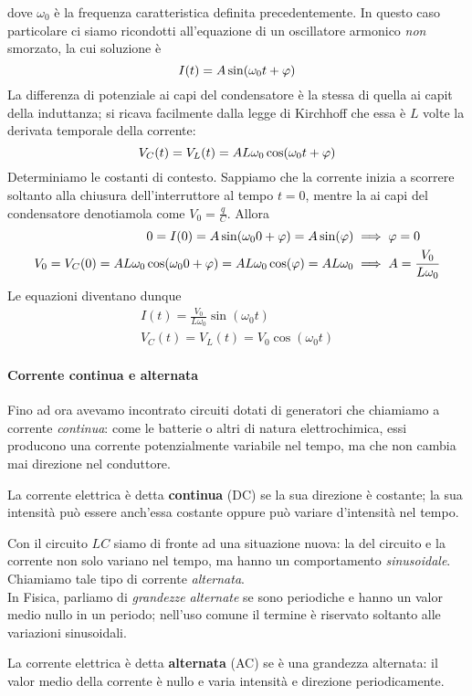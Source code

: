 dove $\omega_0$ è la frequenza caratteristica definita precedentemente. In questo caso particolare ci siamo ricondotti all'equazione di un oscillatore armonico \textit{non} smorzato, la cui soluzione è
\begin{equation}
	I(t)=A\sin(\omega_0 t+\oldphi)
\end{equation}
La differenza di potenziale ai capi del condensatore è la stessa di quella ai capit della induttanza; si ricava facilmente dalla legge di Kirchhoff che essa è $L$ volte la derivata temporale della corrente:
\begin{equation*}
	V_C(t)=V_L(t)=AL\omega_0\cos(\omega_0 t+\oldphi)
\end{equation*}
Determiniamo le costanti di contesto. Sappiamo che la corrente inizia a scorrere soltanto alla chiusura dell'interruttore al tempo $t=0$, mentre la \ddp ai capi del condensatore denotiamola come $V_0=\frac{q}{C}$. Allora
\begin{align*}
	0=I(0)=A\sin(\omega_0 0+\oldphi)=A\sin(\oldphi)&\implies \oldphi =0\\
	V_0=V_C(0)=AL\omega_0\cos(\omega_0 0+\oldphi)=AL\omega_0\cos(\oldphi)=AL\omega_0&\implies A=\frac{V_0}{L\omega_0}
\end{align*}
Le equazioni diventano dunque
\begin{gather}
	I(t)=\frac{V_0}{L\omega_0}\sin(\omega_0 t)\\
	V_C(t)=V_L(t)=V_0\cos(\omega_0 t)
\end{gather}
\paragraph{Corrente continua e alternata}
Fino ad ora avevamo incontrato circuiti dotati di generatori che chiamiamo a corrente \textit{continua}: come le batterie o altri di natura elettrochimica, essi producono una corrente potenzialmente variabile nel tempo, ma che non cambia mai direzione nel conduttore.
\begin{define}
	La corrente elettrica è detta \textbf{continua} (DC) se la sua direzione è costante; la sua intensità può essere anch'essa costante oppure può variare d'intensità nel tempo. 
\end{define}
Con il circuito $LC$ siamo di fronte ad una situazione nuova: la \ddp del circuito e la corrente non solo variano nel tempo, ma hanno un comportamento \textit{sinusoidale}. Chiamiamo tale tipo di corrente \textit{alternata}.\\
In Fisica, parliamo di \textit{grandezze alternate} se sono periodiche e hanno un valor medio nullo in un periodo; nell'uso comune il termine è riservato soltanto alle variazioni sinusoidali.
\begin{define}
	La corrente elettrica è detta \textbf{alternata} (AC) se è una grandezza alternata: il valor medio della corrente è nullo e varia intensità e direzione periodicamente.
\end{define}
